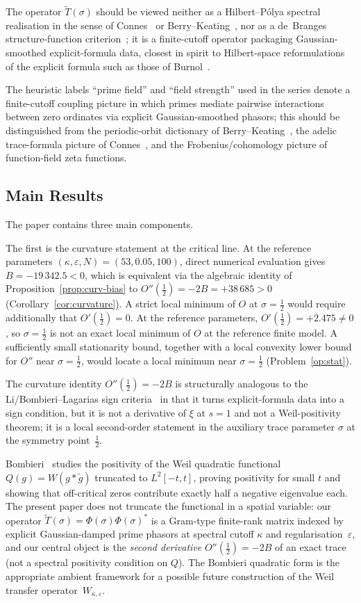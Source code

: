 \documentclass[11pt]{article}
\newcommand{\Tt}{\widetilde{T}}
\begin{document}
The operator $\Tt(\sigma)$ should be viewed neither as a
Hilbert--P\'olya spectral realisation in the sense of
Connes~\cite{Connes} or Berry--Keating~\cite{BerryKeating}, nor as a
de~Branges structure-function criterion~\cite{deBranges}; it is a
finite-cutoff operator packaging Gaussian-smoothed explicit-formula
data, closest in spirit to Hilbert-space reformulations of the
explicit formula such as those of Burnol~\cite{Burnol}.

The heuristic labels ``prime field'' and ``field strength'' used in
the series denote a finite-cutoff coupling picture in which primes
mediate pairwise interactions between zero ordinates via explicit
Gaussian-smoothed phasors; this should be distinguished from the
periodic-orbit dictionary of Berry--Keating~\cite{BerryKeating},
the adelic trace-formula picture of Connes~\cite{Connes}, and the
Frobenius/cohomology picture of function-field zeta functions.

\subsection{Main Results}

The paper contains three main components.

The first is the curvature statement at the critical line.
At the reference parameters $(\kappa,\varepsilon,N)=(53,0.05,100)$,
direct numerical evaluation gives $B=-19\,342.5<0$, which is equivalent
via the algebraic identity of Proposition~\ref{prop:curv-bias} to
$O''(\tfrac12)=-2B=+38\,685>0$
(Corollary~\ref{cor:curvature}).
A strict local minimum of $O$ at $\sigma=\tfrac12$ would require
additionally that $O'(\tfrac12)=0$. At the reference parameters,
$O'(\tfrac12)=+2.475\ne0$, so $\sigma=\tfrac12$ is not an exact
local minimum of $O$ at the reference finite model.
A sufficiently small stationarity bound, together with a local
convexity lower bound for $O''$ near $\sigma=\tfrac12$, would
locate a local minimum near $\sigma=\tfrac12$
(Problem~\ref{op:stat}).

The curvature identity $O''(\tfrac12)=-2B$ is structurally analogous
to the Li/Bombieri--Lagarias sign
criteria~\cite{Li,BombieriLagarias} in that it turns
explicit-formula data into a sign condition, but it is not a
derivative of $\xi$ at $s=1$ and not a Weil-positivity theorem; it
is a local second-order statement in the auxiliary trace parameter
$\sigma$ at the symmetry point~$\tfrac12$.

Bombieri~\cite{Bombieri} studies the positivity of the
Weil quadratic functional $Q(g) = W(g\ast\tilde g)$ truncated
to $L^2[-t,t]$, proving positivity for small $t$ and showing that
off-critical zeros contribute exactly half a negative eigenvalue
each.
The present paper does not truncate the functional in a spatial
variable: our operator $\Tt(\sigma)=\Phi(\sigma)\Phi(\sigma)^*$
is a Gram-type finite-rank matrix indexed by explicit
Gaussian-damped prime phasors at spectral cutoff $\kappa$ and
regularisation~$\varepsilon$, and our central object is the
\emph{second derivative} $O''(\tfrac12) = -2B$ of an exact trace
(not a spectral positivity condition on $Q$).
The Bombieri quadratic form is the appropriate ambient framework
for a possible future construction of the Weil transfer
operator~$W_{\kappa,\varepsilon}$.
\end{document}
